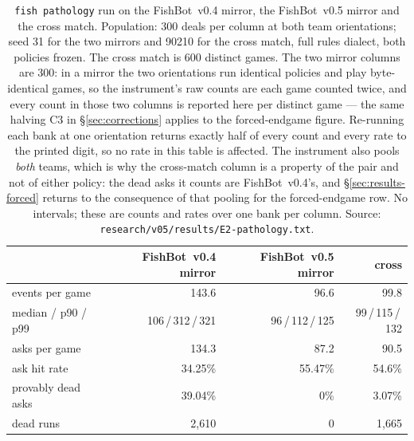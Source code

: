 \documentclass[11pt]{article}
\theoremstyle{definition}
\DeclareRobustCommand{\vfive}{\texorpdfstring{\mbox{FishBot v0.5}}{FishBot v0.5}}
\DeclareRobustCommand{\vfour}{\texorpdfstring{\mbox{FishBot v0.4}}{FishBot v0.4}}
\providecommand{\numFourDeadAsk}{39.04}
\providecommand{\numFiveDeadAsk}{0}
\providecommand{\numPathologyCrossSeed}{90210}
\providecommand{\numPathologyDeals}{300}
\providecommand{\numPathologySeed}{31}
\providecommand{\numCrossAsks}{90.5}
\providecommand{\numCrossDeadAsk}{3.07}
\providecommand{\numCrossDeadRuns}{1{,}665}
\providecommand{\numCrossEventsMean}{99.8}
\providecommand{\numCrossEventsMedian}{99}
\providecommand{\numCrossEventsPninety}{115}
\providecommand{\numCrossEventsPninetynine}{132}
\providecommand{\numCrossHit}{54.6}
\providecommand{\numFiveAsks}{87.2}
\providecommand{\numFiveDeadRuns}{0}
\providecommand{\numFiveEventsMean}{96.6}
\providecommand{\numFiveEventsMedian}{96}
\providecommand{\numFiveEventsPninety}{112}
\providecommand{\numFiveEventsPninetynine}{125}
\providecommand{\numFiveHit}{55.47}
\providecommand{\numFourAsks}{134.3}
\providecommand{\numFourDeadRuns}{2{,}610}
\providecommand{\numFourEventsMean}{143.6}
\providecommand{\numFourEventsMedian}{106}
\providecommand{\numFourEventsPninety}{312}
\providecommand{\numFourEventsPninetynine}{321}
\providecommand{\numFourGames}{300}
\providecommand{\numCrossGames}{600}
\providecommand{\numFourHit}{34.25}
\begin{document}
\begin{table}[t]
\centering
\caption{\texttt{fish pathology} run on the \vfour{} mirror, the \vfive{} mirror
and the cross match. Population: \numPathologyDeals{} deals per column at both
team orientations; seed \numPathologySeed{} for the two mirrors and
\numPathologyCrossSeed{} for the cross match, full rules dialect, both policies
frozen. The cross match is \numCrossGames{} distinct games. The two mirror
columns are \numFourGames{}: in a mirror the two orientations run identical
policies and play byte-identical games, so the instrument's raw counts are each
game counted twice, and every count in those two columns is reported here per
distinct game --- the same halving C3 in \S\ref{sec:corrections} applies to the
forced-endgame figure. Re-running each bank at one orientation returns exactly
half of every count and every rate to the printed digit, so no rate in this
table is affected. The instrument also pools \emph{both} teams, which is why the
cross-match column is a property of the pair and not of either policy: the dead
asks it counts are \vfour{}'s, and \S\ref{sec:results-forced} returns to the
consequence of that pooling for the forced-endgame row. No intervals; these are
counts and rates over one bank per column. Source:
\texttt{research/v05/results/E2-pathology.txt}.}
\label{tab:pathology}
\footnotesize
\begin{tabular}{lrrr}
\toprule
& \textbf{\vfour{} mirror} & \textbf{\vfive{} mirror} & \textbf{cross} \\
\midrule
events per game                        & \numFourEventsMean{}  & \numFiveEventsMean{}  & \numCrossEventsMean{} \\
\quad median / p90 / p99               & \numFourEventsMedian{}\,/\,\numFourEventsPninety{}\,/\,\numFourEventsPninetynine{}
                                       & \numFiveEventsMedian{}\,/\,\numFiveEventsPninety{}\,/\,\numFiveEventsPninetynine{}
                                       & \numCrossEventsMedian{}\,/\,\numCrossEventsPninety{}\,/\,\numCrossEventsPninetynine{} \\
asks per game                          & \numFourAsks{}        & \numFiveAsks{}        & \numCrossAsks{} \\
ask hit rate                           & \numFourHit\%         & \numFiveHit\%         & \numCrossHit\% \\
\midrule
provably dead asks                     & \numFourDeadAsk\%     & \numFiveDeadAsk\%     & \numCrossDeadAsk\% \\
dead runs                              & \numFourDeadRuns{}    & \numFiveDeadRuns{}    & \numCrossDeadRuns{} \\

\end{tabular}
\end{table}
\end{document}
